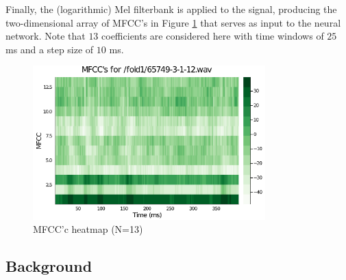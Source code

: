 \documentclass[a4paper,12pt]{article}
\numberwithin{equation}{section}
\numberwithin{figure}{section}
\numberwithin{table}{section}
\begin{document}
Finally, the (logarithmic) Mel filterbank is applied to the signal, producing the two-dimensional array of MFCC's in Figure \ref{mfcc_example} that serves as input to the neural network. Note that $13$ coefficients are considered here with time windows of $25$ ms and a step size of $10$ ms. %


\begin{figure}[h!]
    \centering %
    \includegraphics[padding=1ex,width=0.8\textwidth,frame]{img/mfcc_example.png}
    \caption{MFCC'c heatmap (N=13)}
    \label{mfcc_example}
\end{figure}

\subsection{Background}




\end{document}
